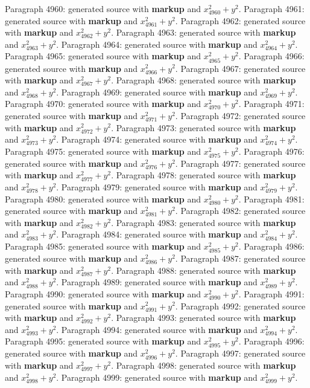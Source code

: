 \documentclass{article}
\begin{document}
Paragraph 4960: generated source with \textbf{markup} and $x_{4960}^2 + y^2$.
Paragraph 4961: generated source with \textbf{markup} and $x_{4961}^2 + y^2$.
Paragraph 4962: generated source with \textbf{markup} and $x_{4962}^2 + y^2$.
Paragraph 4963: generated source with \textbf{markup} and $x_{4963}^2 + y^2$.
Paragraph 4964: generated source with \textbf{markup} and $x_{4964}^2 + y^2$.
Paragraph 4965: generated source with \textbf{markup} and $x_{4965}^2 + y^2$.
Paragraph 4966: generated source with \textbf{markup} and $x_{4966}^2 + y^2$.
Paragraph 4967: generated source with \textbf{markup} and $x_{4967}^2 + y^2$.
Paragraph 4968: generated source with \textbf{markup} and $x_{4968}^2 + y^2$.
Paragraph 4969: generated source with \textbf{markup} and $x_{4969}^2 + y^2$.
Paragraph 4970: generated source with \textbf{markup} and $x_{4970}^2 + y^2$.
Paragraph 4971: generated source with \textbf{markup} and $x_{4971}^2 + y^2$.
Paragraph 4972: generated source with \textbf{markup} and $x_{4972}^2 + y^2$.
Paragraph 4973: generated source with \textbf{markup} and $x_{4973}^2 + y^2$.
Paragraph 4974: generated source with \textbf{markup} and $x_{4974}^2 + y^2$.
Paragraph 4975: generated source with \textbf{markup} and $x_{4975}^2 + y^2$.
Paragraph 4976: generated source with \textbf{markup} and $x_{4976}^2 + y^2$.
Paragraph 4977: generated source with \textbf{markup} and $x_{4977}^2 + y^2$.
Paragraph 4978: generated source with \textbf{markup} and $x_{4978}^2 + y^2$.
Paragraph 4979: generated source with \textbf{markup} and $x_{4979}^2 + y^2$.
Paragraph 4980: generated source with \textbf{markup} and $x_{4980}^2 + y^2$.
Paragraph 4981: generated source with \textbf{markup} and $x_{4981}^2 + y^2$.
Paragraph 4982: generated source with \textbf{markup} and $x_{4982}^2 + y^2$.
Paragraph 4983: generated source with \textbf{markup} and $x_{4983}^2 + y^2$.
Paragraph 4984: generated source with \textbf{markup} and $x_{4984}^2 + y^2$.
Paragraph 4985: generated source with \textbf{markup} and $x_{4985}^2 + y^2$.
Paragraph 4986: generated source with \textbf{markup} and $x_{4986}^2 + y^2$.
Paragraph 4987: generated source with \textbf{markup} and $x_{4987}^2 + y^2$.
Paragraph 4988: generated source with \textbf{markup} and $x_{4988}^2 + y^2$.
Paragraph 4989: generated source with \textbf{markup} and $x_{4989}^2 + y^2$.
Paragraph 4990: generated source with \textbf{markup} and $x_{4990}^2 + y^2$.
Paragraph 4991: generated source with \textbf{markup} and $x_{4991}^2 + y^2$.
Paragraph 4992: generated source with \textbf{markup} and $x_{4992}^2 + y^2$.
Paragraph 4993: generated source with \textbf{markup} and $x_{4993}^2 + y^2$.
Paragraph 4994: generated source with \textbf{markup} and $x_{4994}^2 + y^2$.
Paragraph 4995: generated source with \textbf{markup} and $x_{4995}^2 + y^2$.
Paragraph 4996: generated source with \textbf{markup} and $x_{4996}^2 + y^2$.
Paragraph 4997: generated source with \textbf{markup} and $x_{4997}^2 + y^2$.
Paragraph 4998: generated source with \textbf{markup} and $x_{4998}^2 + y^2$.
Paragraph 4999: generated source with \textbf{markup} and $x_{4999}^2 + y^2$.
\end{document}
